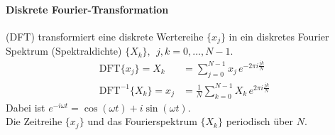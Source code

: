 \paragraph{Diskrete Fourier-Transformation} (DFT) transformiert eine diskrete Wertereihe $\{x_j\}$ in ein diskretes Fourier Spektrum (Spektraldichte) $\{X_k\}, ~~ j,k=0,\dots,N-1$.
\begin{align}
\mathrm{DFT}\{ x_j \} = X_k & =\sum\limits_{j=0}^{N-1}x_j\,e^{-2\pi i \frac{jk}{N}} \\
\mathrm{DFT}^{-1}\{X_k\} = x_j & =\frac{1}{N} \sum\limits_{k=0}^{N-1}X_k\,e^{2\pi i \frac{jk}{N}}
\end{align}
Dabei ist $e^{-i \omega t} = \cos(\omega t) + i \sin(\omega t)$.\\
Die Zeitreihe $\{x_j\}$ und das Fourierspektrum $\{X_k\}$ periodisch über $N$.

